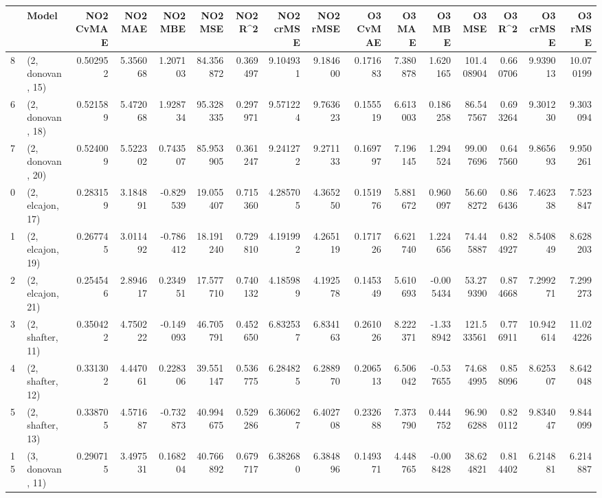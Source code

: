 \begin{tabular}{llrrrrrrrrrrrrrr}
\toprule
{} &             Model &  NO2 CvMAE &   NO2 MAE &   NO2 MBE &    NO2 MSE &   NO2 R\textasciicircum2 &  NO2 crMSE &  NO2 rMSE &  O3 CvMAE &    O3 MAE &    O3 MBE &      O3 MSE &    O3 R\textasciicircum2 &   O3 crMSE &    O3 rMSE \\
\midrule
8  &  (2, donovan, 15) &   0.502952 &  5.356068 &  1.207103 &  84.356872 &  0.369497 &   9.104931 &  9.184600 &  0.171683 &  7.380878 &  1.620165 &  101.408904 &  0.660706 &   9.939013 &  10.070199 \\
6  &  (2, donovan, 18) &   0.521589 &  5.472068 &  1.928734 &  95.328335 &  0.297971 &   9.571224 &  9.763623 &  0.155519 &  6.613003 &  0.186258 &   86.547567 &  0.693264 &   9.301230 &   9.303094 \\
7  &  (2, donovan, 20) &   0.524009 &  5.522302 &  0.743507 &  85.953905 &  0.361247 &   9.241272 &  9.271133 &  0.169797 &  7.196145 &  1.294524 &   99.007696 &  0.647560 &   9.865693 &   9.950261 \\
0  &  (2, elcajon, 17) &   0.283159 &  3.184891 & -0.829539 &  19.055407 &  0.715360 &   4.285705 &  4.365250 &  0.151976 &  5.881672 &  0.960097 &   56.608272 &  0.866436 &   7.462338 &   7.523847 \\
1  &  (2, elcajon, 19) &   0.267745 &  3.011492 & -0.786412 &  18.191240 &  0.729810 &   4.191992 &  4.265119 &  0.171726 &  6.621740 &  1.224656 &   74.445887 &  0.824927 &   8.540849 &   8.628203 \\
2  &  (2, elcajon, 21) &   0.254546 &  2.894617 &  0.234951 &  17.577710 &  0.740132 &   4.185989 &  4.192578 &  0.145349 &  5.610693 & -0.005434 &   53.279390 &  0.874668 &   7.299271 &   7.299273 \\
3  &  (2, shafter, 11) &   0.350422 &  4.750222 & -0.149093 &  46.705791 &  0.452650 &   6.832537 &  6.834163 &  0.261026 &  8.222371 & -1.338942 &  121.533561 &  0.776911 &  10.942614 &  11.024226 \\
4  &  (2, shafter, 12) &   0.331302 &  4.447061 &  0.228306 &  39.551147 &  0.536775 &   6.284825 &  6.288970 &  0.206513 &  6.506042 & -0.537655 &   74.684995 &  0.858096 &   8.625307 &   8.642048 \\
5  &  (2, shafter, 13) &   0.338705 &  4.571687 & -0.732873 &  40.994675 &  0.529286 &   6.360627 &  6.402708 &  0.232688 &  7.373790 &  0.444752 &   96.906288 &  0.820112 &   9.834047 &   9.844099 \\
15 &  (3, donovan, 11) &   0.290715 &  3.497531 &  0.168204 &  40.766892 &  0.679717 &   6.382680 &  6.384896 &  0.149371 &  4.448765 & -0.008428 &   38.624821 &  0.814402 &   6.214881 &   6.214887 \\

\end{tabular}
